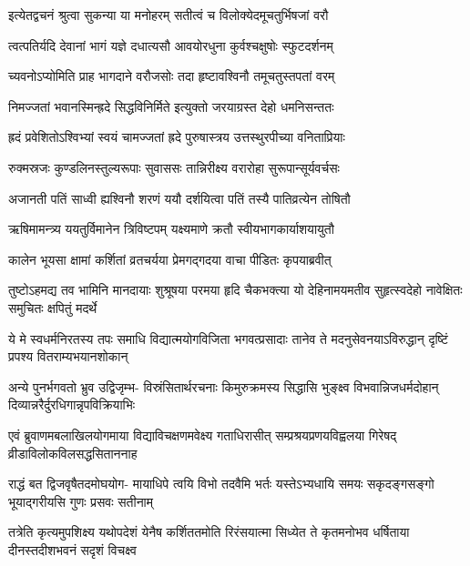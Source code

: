 \twolineshloka
{इत्येतद्वचनं श्रुत्वा सुकन्या या मनोहरम्}
{सतीत्वं च विलोक्येदमूचतुर्भिषजां वरौ}%

\twolineshloka
{त्वत्पतिर्यदि देवानां भागं यज्ञे दधात्यसौ}
{आवयोरधुना कुर्वश्चक्षुषोः स्फुटदर्शनम्}%

\twolineshloka
{च्यवनोऽप्योमिति प्राह भागदाने वरौजसोः}
{तदा हृष्टावश्विनौ तमूचतुस्तपतां वरम्}%

\twolineshloka
{निमज्जतां भवानस्मिन्ह्रदे सिद्धविनिर्मिते}
{इत्युक्तो जरयाग्रस्त देहो धमनिसन्ततः}%

\twolineshloka
{ह्रदं प्रवेशितोऽश्विभ्यां स्वयं चामज्जतां ह्रदे}
{पुरुषास्त्रय उत्तस्थुरपीच्या वनिताप्रियाः}%

\twolineshloka
{रुक्मस्रजः कुण्डलिनस्तुल्यरूपाः सुवाससः}
{तान्निरीक्ष्य वरारोहा सुरूपान्सूर्यवर्चसः}%

\twolineshloka
{अजानती पतिं साध्वी ह्यश्विनौ शरणं ययौ}
{दर्शयित्वा पतिं तस्यै पातिव्रत्येन तोषितौ}%

\twolineshloka
{ऋषिमामन्त्र्य ययतुर्विमानेन त्रिविष्टपम्}
{यक्ष्यमाणे क्रतौ स्वीयभागकार्याशयायुतौ}%

\twolineshloka
{कालेन भूयसा क्षामां कर्शितां व्रतचर्यया}
{प्रेमगद्गदया वाचा पीडितः कृपयाब्रवीत्}%

\fourlineindentedshloka
{तुष्टोऽहमद्य तव भामिनि मानदायाः}
{शुश्रूषया परमया हृदि चैकभक्त्या}
{यो देहिनामयमतीव सुहृत्स्वदेहो}
{नावेक्षितः समुचितः क्षपितुं मदर्थे}%

\fourlineindentedshloka
{ये मे स्वधर्मनिरतस्य तपः समाधि}
{विद्यात्मयोगविजिता भगवत्प्रसादाः}
{तानेव ते मदनुसेवनयाऽविरुद्धान्}
{दृष्टिं प्रपश्य वितराम्यभयानशोकान्}%

\fourlineindentedshloka
{अन्ये पुनर्भगवतो भ्रुव उद्विजृम्भ-}
{विस्रंसितार्थरचनाः किमुरुक्रमस्य}
{सिद्धासि भुङ्क्ष्व विभवान्निजधर्मदोहान्}
{दिव्यान्नरैर्दुरधिगान्नृपविक्रियाभिः}%

\fourlineindentedshloka
{एवं ब्रुवाणमबलाखिलयोगमाया}
{विद्याविचक्षणमवेक्ष्य गताधिरासीत्}
{सम्प्रश्रयप्रणयविह्वलया गिरेषद्}
{व्रीडाविलोकविलसद्धसिताननाह}%


\fourlineindentedshloka
{राद्धं बत द्विजवृषैतदमोघयोग-}
{मायाधिपे त्वयि विभो तदवैमि भर्तः}
{यस्तेऽभ्यधायि समयः सकृदङ्गसङ्गो}
{भूयाद्गरीयसि गुणः प्रसवः सतीनाम्}%

\fourlineindentedshloka
{तत्रेति कृत्यमुपशिक्ष्य यथोपदेशं}
{येनैष कर्शिततमोति रिरंसयात्मा}
{सिध्येत ते कृतमनोभव धर्षिताया}
{दीनस्तदीशभवनं सदृशं विचक्ष्व}%


